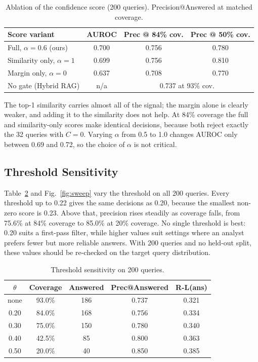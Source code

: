 \documentclass[conference]{IEEEtran}
\begin{document}
\begin{table}[t]
\caption{Ablation of the confidence score (200 queries). Precision@Answered
at matched coverage.}
\label{tab:ablation}
\centering
\footnotesize
\setlength{\tabcolsep}{4pt}
\renewcommand{\arraystretch}{1.15}
\begin{tabular}{@{}l ccc@{}}
\toprule
Score variant & AUROC & Prec @ 84\% cov. & Prec @ 50\% cov. \\
\midrule
Full, $\alpha=0.6$ (ours)     & 0.700 & 0.756 & 0.780 \\
Similarity only, $\alpha=1$   & 0.699 & 0.756 & 0.810 \\
Margin only, $\alpha=0$       & 0.637 & 0.708 & 0.770 \\
No gate (Hybrid RAG)          & n/a   & \multicolumn{2}{c}{0.737 at 93\% cov.} \\
\bottomrule
\end{tabular}
\end{table}

The top-1 similarity carries almost all of the signal; the margin alone is
clearly weaker, and adding it to the similarity does not help. At 84\%
coverage the full and similarity-only scores make identical decisions,
because both reject exactly the 32 queries with $C=0$. Varying $\alpha$
from 0.5 to 1.0 changes AUROC only between 0.69 and 0.72, so the choice of
$\alpha$ is not critical.

\subsection{Threshold Sensitivity}
Table~\ref{tab:threshold} and Fig.~\ref{fig:sweep} vary the threshold on
all 200 queries. Every threshold up to 0.22 gives the same decisions as
0.20, because the smallest non-zero score is 0.23. Above that, precision
rises steadily as coverage falls, from 75.6\% at 84\% coverage to 85.0\%
at 20\% coverage. No single threshold is best: 0.20 suits a first-pass
filter, while higher values suit settings where an analyst prefers fewer
but more reliable answers. With 200 queries and no held-out split, these
values should be re-checked on the target query distribution.

\begin{table}[t]
\caption{Threshold sensitivity on 200 queries.}
\label{tab:threshold}
\centering
\footnotesize
\setlength{\tabcolsep}{5pt}
\renewcommand{\arraystretch}{1.15}
\begin{tabular}{@{}c cccc@{}}
\toprule
$\theta$ & Coverage & Answered & Prec@Answered & R-L(ans) \\
\midrule
none & 93.0\% & 186 & 0.737 & 0.321 \\
0.20 & 84.0\% & 168 & 0.756 & 0.334 \\
0.30 & 75.0\% & 150 & 0.780 & 0.340 \\
0.40 & 42.5\% & 85  & 0.800 & 0.363 \\
0.50 & 20.0\% & 40  & 0.850 & 0.385 \\
\bottomrule
\end{tabular}
\end{table}
\end{document}
